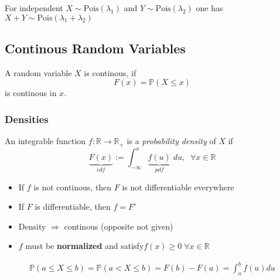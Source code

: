 For independent $X \sim \mathrm{Pois}(\lambda_1)$ and $Y \sim \mathrm{Pois}(\lambda_2)$ one has $X+Y \sim \mathrm{Pois}(\lambda_1 +\lambda_2)$

\subsection{Continous Random Variables}
A random variable $X$ is continous, if
\noindent\begin{equation*}
    F(x)=\mathbb{P}(X\leq x)
\end{equation*}
is continous in $x$.


\subsubsection{Densities}
An integrable function $f:\mathbb{R}\rightarrow\mathbb{R}_+$ is a \textit{probability density} of $X$ if
\noindent\begin{equation*}
    \underbrace{F(x)}_{cdf} := \int_{-\infty}^{x} \underbrace{f(u)}_{pdf}\; du,\;\; \forall x\in \mathbb{R}
\end{equation*}
\begin{itemize}
    \item If $f$ is not continous, then $F$ is not differentiable everywhere
    \item If $F$ is differentiable, then $f = F'$
    \item Density $\Rightarrow$ continous (opposite not given)
    \item $f$ must be \textbf{normalized} and satisfy\newline $f(x)\geq 0 \; \forall x\in\mathbb{R}$
\end{itemize}
\noindent\begin{align*}
    \mathbb{P}(a\leq X\leq b)=\mathbb{P}(a<X\leq b)=F(b)-F(a)=\int_a^b f(u)du
\end{align*}
